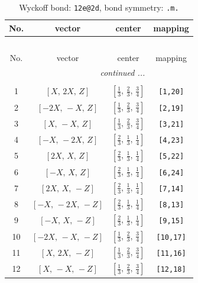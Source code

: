 \documentclass[fleqn,8pt]{jsarticle}
\begin{document}
\renewcommand{\arraystretch}{1.2}
\begin{longtable}{cccc}
\caption{Wyckoff bond: {\tt 12e@2d}, bond symmetry: {\tt .m.}}
 \\
 \hline \hline
No. & vector & center & mapping \\ \hline \endfirsthead

\multicolumn{3}{l}{\tablename\ \thetable{}} \\
 \hline \hline
No. & vector & center & mapping \\ \hline \endhead

 \hline \hline
\multicolumn{3}{r}{\footnotesize\it continued ...} \\ \endfoot

 \hline \hline
\multicolumn{3}{r}{} \\ \endlastfoot

1 & $\left[ X,\, 2 X,\, Z \right]$ & $\left[ \frac{1}{3},\, \frac{2}{3},\, \frac{3}{4} \right]$ & {\tt [1,20]} \\ \hline
2 & $\left[ - 2 X,\, - X,\, Z \right]$ & $\left[ \frac{1}{3},\, \frac{2}{3},\, \frac{3}{4} \right]$ & {\tt [2,19]} \\ \hline
3 & $\left[ X,\, - X,\, Z \right]$ & $\left[ \frac{1}{3},\, \frac{2}{3},\, \frac{3}{4} \right]$ & {\tt [3,21]} \\ \hline
4 & $\left[ - X,\, - 2 X,\, Z \right]$ & $\left[ \frac{2}{3},\, \frac{1}{3},\, \frac{1}{4} \right]$ & {\tt [4,23]} \\ \hline
5 & $\left[ 2 X,\, X,\, Z \right]$ & $\left[ \frac{2}{3},\, \frac{1}{3},\, \frac{1}{4} \right]$ & {\tt [5,22]} \\ \hline
6 & $\left[ - X,\, X,\, Z \right]$ & $\left[ \frac{2}{3},\, \frac{1}{3},\, \frac{1}{4} \right]$ & {\tt [6,24]} \\ \hline
7 & $\left[ 2 X,\, X,\, - Z \right]$ & $\left[ \frac{2}{3},\, \frac{1}{3},\, \frac{1}{4} \right]$ & {\tt [7,14]} \\ \hline
8 & $\left[ - X,\, - 2 X,\, - Z \right]$ & $\left[ \frac{2}{3},\, \frac{1}{3},\, \frac{1}{4} \right]$ & {\tt [8,13]} \\ \hline
9 & $\left[ - X,\, X,\, - Z \right]$ & $\left[ \frac{2}{3},\, \frac{1}{3},\, \frac{1}{4} \right]$ & {\tt [9,15]} \\ \hline
10 & $\left[ - 2 X,\, - X,\, - Z \right]$ & $\left[ \frac{1}{3},\, \frac{2}{3},\, \frac{3}{4} \right]$ & {\tt [10,17]} \\ \hline
11 & $\left[ X,\, 2 X,\, - Z \right]$ & $\left[ \frac{1}{3},\, \frac{2}{3},\, \frac{3}{4} \right]$ & {\tt [11,16]} \\ \hline
12 & $\left[ X,\, - X,\, - Z \right]$ & $\left[ \frac{1}{3},\, \frac{2}{3},\, \frac{3}{4} \right]$ & {\tt [12,18]} \\
\end{longtable}
\end{document}
